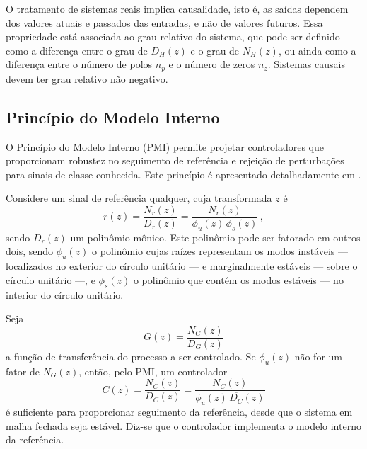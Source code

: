 \documentclass[repeatfields,oneside,overleaf]{tcc}
\newcommand{\mycdot}{ \, }
\begin{document}
O tratamento de sistemas reais implica causalidade, isto é, as saídas dependem dos valores atuais e passados das entradas, e não de valores futuros.
Essa propriedade está associada ao grau relativo do sistema, que pode ser definido como a diferença entre o grau de $D_H(z)$ e o grau de $N_H(z)$, ou ainda como a diferença entre o número de polos $n_p$ e o número de zeros $n_z$.
Sistemas causais devem ter grau relativo não negativo.

\subsection{Princípio do Modelo Interno}\label{sec:controle_PMI}

O Princípio do Modelo Interno (PMI) permite projetar controladores que proporcionam robustez no seguimento de referência e rejeição de perturbações para sinais de classe conhecida.
Este princípio é apresentado detalhadamente em \cite{Chen1999}.

Considere um sinal de referência qualquer, cuja transformada $z$ é
\begin{equation}\label{eq:pmi_r_frac}
    r(z) = \dfrac{ N_r(z) } {D_r(z) } = \dfrac{ N_r(z) }{ \phi_u(z) \mycdot \phi_s(z) }
    \,,
\end{equation}
sendo $D_r(z)$ um polinômio mônico.
Este polinômio pode ser fatorado em outros dois, sendo $\phi_u(z)$ o polinômio cujas raízes representam os modos instáveis --- localizados no exterior do círculo unitário --- e marginalmente estáveis --- sobre o círculo unitário ---, e $\phi_s(z)$ o polinômio que contém os modos estáveis --- no interior do círculo unitário.

Seja
\begin{equation}\label{eq:pmi_G_frac}
    G(z) = \dfrac{ N_G(z) }{ D_G(z) }
\end{equation}
a função de transferência do processo a ser controlado.
Se $\phi_u(z)$ não for um fator de $N_G(z)$, então, pelo PMI, um controlador
\begin{equation}\label{eq:pmi_C_frac}
    C(z) = \dfrac{ N_C(z) }{ D_C(z) } = \dfrac{ N_C(z) }{ \phi_u(z) \mycdot \overline{D_C}(z) }
\end{equation}
é suficiente para proporcionar seguimento da referência, desde que o sistema em malha fechada seja estável.
Diz-se que o controlador implementa o modelo interno da referência.

\end{document}

